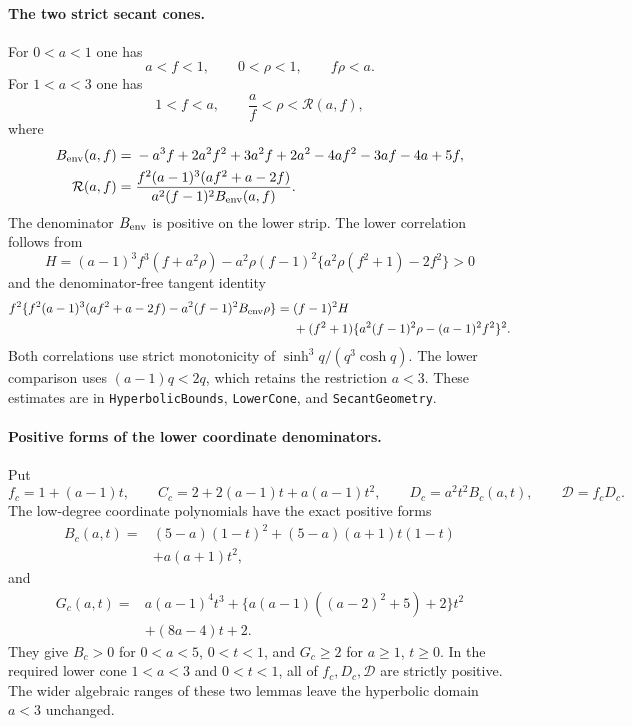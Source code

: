 \paragraph{The two strict secant cones.}
For $0<a<1$ one has
\[
 a<f<1,\qquad 0<\rho<1,\qquad f\rho<a.
\]
For $1<a<3$ one has
\[
 1<f<a,\qquad \frac af<\rho<\mathcal R(a,f),
\]
where
\[
 \begin{split}
 B_{\rm env}(a,f)={}&-a^3f+2a^2f^2+3a^2f+2a^2
                    -4af^2-3af-4a+5f,\\
 \mathcal R(a,f)={}&
 \frac{f^2(a-1)^3(af^2+a-2f)}{a^2(f-1)^2B_{\rm env}(a,f)}.
 \end{split}
\]
The denominator $B_{\rm env}$ is positive on the lower strip.
The lower correlation follows from
\[
 H=(a-1)^3f^3(f+a^2\rho)
   -a^2\rho(f-1)^2\{a^2\rho(f^2+1)-2f^2\}>0
\]
and the denominator-free tangent identity
\[
 \begin{split}
 f^2\{f^2(a-1)^3(af^2+a-2f)-a^2(f-1)^2B_{\rm env}\rho\}
  ={}&(f-1)^2H\\
    &+(f^2+1)\{a^2(f-1)^2\rho-(a-1)^2f^2\}^2.
 \end{split}
\]
Both correlations use strict monotonicity of
$\sinh^3q/(q^3\cosh q)$. The lower comparison uses
$(a-1)q<2q$, which retains the restriction $a<3$.
These estimates are in \texttt{HyperbolicBounds}, \texttt{LowerCone},
and \texttt{SecantGeometry}.

\paragraph{Positive forms of the lower coordinate denominators.}
Put
\[
 f_c=1+(a-1)t,\qquad
 C_c=2+2(a-1)t+a(a-1)t^2,\qquad
 D_c=a^2t^2B_c(a,t),\qquad \mathcal D=f_cD_c.
\]
The low-degree coordinate polynomials have the exact positive forms
\[
 \begin{split}
 B_c(a,t)={}&(5-a)(1-t)^2+(5-a)(a+1)t(1-t)\\
            &+a(a+1)t^2,
 \end{split}
\]
and
\[
 \begin{split}
 G_c(a,t)={}&a(a-1)^4t^3+
       \{a(a-1)((a-2)^2+5)+2\}t^2\\
            &+(8a-4)t+2.
 \end{split}
\]
They give $B_c>0$ for $0<a<5$, $0<t<1$, and $G_c\ge2$ for
$a\ge1$, $t\ge0$. In the required lower cone $1<a<3$ and
$0<t<1$, all of $f_c,D_c,\mathcal D$ are strictly positive.
The wider algebraic ranges of these two lemmas leave the hyperbolic
domain $a<3$ unchanged.

